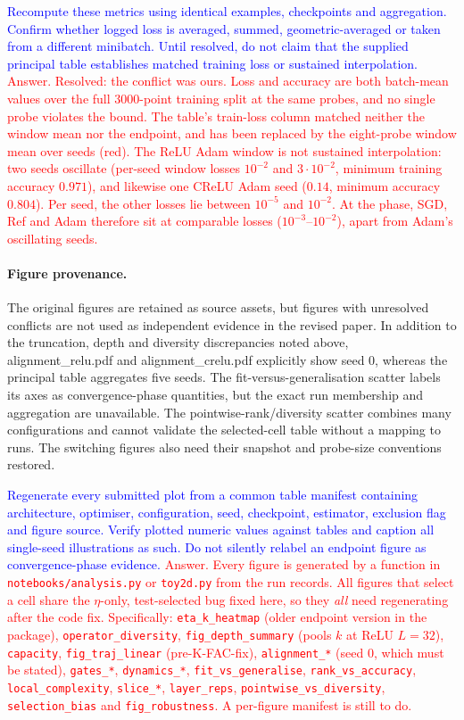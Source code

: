 \documentclass{article}
\newcommand{\zied}[1]{\textcolor{blue}{#1}}
\newcommand{\nat}[1]{\textcolor{red}{#1}}
\theoremstyle{definition}
\theoremstyle{remark}
\begin{document}
\zied{Recompute these metrics using identical examples, checkpoints and aggregation. Confirm whether logged loss is averaged, summed, geometric-averaged or taken from a different minibatch. Until resolved, do not claim that the supplied principal table establishes matched training loss or sustained interpolation.}
\nat{Answer. Resolved: the conflict was ours. Loss and accuracy are both batch-mean values over the full $3000$-point training split at the same probes, and no single probe violates the bound. The table's train-loss column matched neither the window mean nor the endpoint, and has been replaced by the eight-probe window mean over seeds (red). The ReLU Adam window is not sustained interpolation: two seeds oscillate (per-seed window losses $10^{-2}$ and $3\cdot10^{-2}$, minimum training accuracy $0.971$), and likewise one CReLU Adam seed ($0.14$, minimum accuracy $0.804$). Per seed, the other losses lie between $10^{-5}$ and $10^{-2}$. At the phase, SGD, Ref and Adam therefore sit at comparable losses ($10^{-3}$--$10^{-2}$), apart from Adam's oscillating seeds.}

\paragraph{Figure provenance.}
The original figures are retained as source assets, but figures with unresolved conflicts are not used as independent evidence in the revised paper. In addition to the truncation, depth and diversity discrepancies noted above, alignment\_relu.pdf and alignment\_crelu.pdf explicitly show seed 0, whereas the principal table aggregates five seeds. The fit-versus-generalisation scatter labels its axes as convergence-phase quantities, but the exact run membership and aggregation are unavailable. The pointwise-rank/diversity scatter combines many configurations and cannot validate the selected-cell table without a mapping to runs. The switching figures also need their snapshot and probe-size conventions restored.

\zied{ Regenerate every submitted plot from a common table manifest containing architecture, optimiser, configuration, seed, checkpoint, estimator, exclusion flag and figure source. Verify plotted numeric values against tables and caption all single-seed illustrations as such. Do not silently relabel an endpoint figure as convergence-phase evidence.}
\nat{Answer. Every figure is generated by a function in \texttt{notebooks/analysis.py} or \texttt{toy2d.py} from the run records. All figures that select a cell share the $\eta$-only, test-selected bug fixed here, so they \emph{all} need regenerating after the code fix. Specifically: \texttt{eta\_k\_heatmap} (older endpoint version in the package), \texttt{operator\_diversity}, \texttt{fig\_depth\_summary} (pools $k$ at ReLU $L=32$), \texttt{capacity}, \texttt{fig\_traj\_linear} (pre-K-FAC-fix), \texttt{alignment\_*} (seed $0$, which must be stated), \texttt{gates\_*}, \texttt{dynamics\_*}, \texttt{fit\_vs\_generalise}, \texttt{rank\_vs\_accuracy}, \texttt{local\_complexity}, \texttt{slice\_*}, \texttt{layer\_reps}, \texttt{pointwise\_vs\_diversity}, \texttt{selection\_bias} and \texttt{fig\_robustness}. A per-figure manifest is still to do.}
\end{document}

